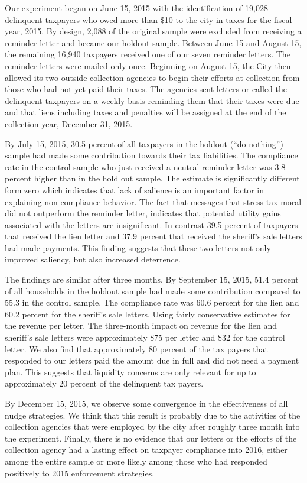 \documentclass[12pt]{article}
\begin{document}
Our experiment began on June 15, 2015 with the identification of
19,028 delinquent taxpayers who owed more than \$10 to the city in
taxes for the fiscal year, 2015.  By design, 2,088 of the original
sample were excluded from receiving a reminder letter and became our
holdout sample.  Between June 15 and August 15, the remaining 16,940
taxpayers received one of our seven reminder letters.  The reminder
letters were mailed only once.  Beginning on August 15, the City then
allowed its two outside collection agencies to begin their efforts at
collection from those who had not yet paid their taxes.  The agencies
sent letters or called the delinquent taxpayers on a weekly basis
reminding them that their taxes were due and that liens including
taxes and penalties will be assigned at the end of the collection
year, December 31, 2015.

By July 15, 2015, 30.5 percent of all taxpayers in the holdout (``do
nothing'') sample had made some contribution towards their tax
liabilities.  The compliance rate in the control sample who just
received a neutral reminder letter was 3.8 percent higher than in the
hold out sample. The estimate is significantly different form zero
which indicates that lack of salience is an important factor in
explaining non-compliance behavior.  The fact that messages that
stress tax moral did not outperform the reminder letter, indicates
that potential utility gains associated with the letters are
insignificant. In contrast 39.5 percent of taxpayers that received the
lien letter and 37.9 percent that received the sheriff's sale letters
had made payments. This finding suggests that these two letters not
only improved saliency, but also increased deterrence.

The findings are similar after three months.  By September 15, 2015,
51.4 percent of all households in the holdout sample had made some
contribution compared to 55.3 in the control sample. The compliance
rate was 60.6 percent for the lien and 60.2 percent for the sheriff's
sale letters. Using fairly conservative estimates for the revenue per
letter. The three-month impact on revenue for the lien and sheriff's
sale letters were approximately \$75 per letter and \$32 for the
control letter.  We also find that approximately 80 percent of the tax
payers that responded to our letters paid the amount due in full and
did not need a payment plan. This suggests that liquidity concerns are
only relevant for up to approximately 20 percent of the delinquent tax
payers.

By December 15, 2015, we observe some convergence in the effectiveness
of all nudge strategies. We think that this result is probably due to
the activities of the collection agencies that were employed by the
city after roughly three month into the experiment. Finally, there is
no evidence that our letters or the efforts of the collection agency
had a lasting effect on taxpayer compliance into 2016, either among
the entire sample or more likely among those who had responded
positively to 2015 enforcement strategies.
\end{document}
